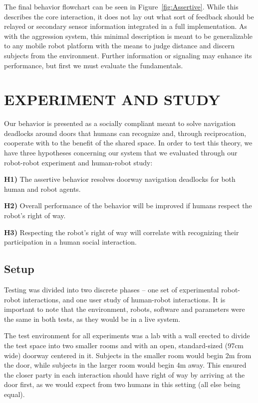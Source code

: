 \documentclass[letterpaper, 10 pt, conference]{ieeeconf}  %
\begin{document}
The final behavior flowchart can be seen in Figure~\ref{fig:Assertive}. While this describes the core interaction, it does not lay out what sort of feedback should be relayed or secondary sensor information integrated in a full implementation. As with the aggression system, this minimal description is meant to be generalizable to any mobile robot platform with the means to judge distance and discern subjects from the environment. Further information or signaling may enhance its performance, but first we must evaluate the fundamentals.


\section{EXPERIMENT AND STUDY}

Our behavior is presented as a socially compliant meant to solve navigation deadlocks around doors that humans can recognize and, through reciprocation, cooperate with to the benefit of the shared space. In order to test this theory, we have three hypotheses concerning our system that we evaluated through our robot-robot experiment and human-robot study:

\textbf{H1)} The assertive behavior resolves doorway navigation deadlocks for both human and robot agents.

\textbf{H2)} Overall performance of the behavior will be improved if humans respect the robot's right of way.

\textbf{H3)} Respecting the robot's right of way will correlate with recognizing their participation in a human social interaction.


\subsection{Setup}

Testing was divided into two discrete phases – one set of experimental robot-robot interactions, and one user study of human-robot interactions. It is important to note that the environment, robots, software and parameters were the same in both tests, as they would be in a live system.

The test environment for all experiments was a lab with a wall erected to divide the test space into two smaller rooms and with an open, standard-sized (97cm wide) doorway centered in it. Subjects in the smaller room would begin 2m from the door, while subjects in the larger room would begin 4m away. This ensured the closer party in each interaction should have right of way by arriving at the door first, as we would expect from two humans in this setting (all else being equal).
\end{document}
